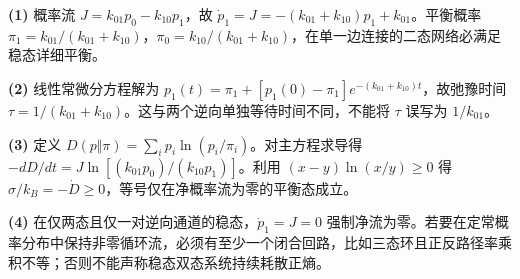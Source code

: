 \par\noindent\textbf{(1)} 概率流 \(J=k_{01}p_0-k_{10}p_1\)，故 \(\dot p_1=J=- (k_{01}+k_{10})p_1+k_{01}\)。平衡概率 \(\pi_1=k_{01}/(k_{01}+k_{10})\)，\(\pi_0=k_{10}/(k_{01}+k_{10})\)，在单一边连接的二态网络必满足稳态详细平衡。
\par\noindent\textbf{(2)} 线性常微分方程解为 \(p_1(t)=\pi_1+[p_1(0)-\pi_1]e^{-(k_{01}+k_{10})t}\)，故弛豫时间 \(\tau=1/(k_{01}+k_{10})\)。这与两个逆向单独等待时间不同，不能将 \(\tau\) 误写为 \(1/k_{01}\)。
\par\noindent\textbf{(3)} 定义 \(D(p\Vert\pi)=\sum_ip_i\ln(p_i/\pi_i)\)。对主方程求导得 \(-dD/dt=J\ln[(k_{01}p_0)/(k_{10}p_1)]\)。利用 \((x-y)\ln(x/y)\ge0\) 得 \(\sigma/k_B=-\dot D\ge0\)，等号仅在净概率流为零的平衡态成立。
\par\noindent\textbf{(4)} 在仅两态且仅一对逆向通道的稳态，\(\dot p_1=J=0\) 强制净流为零。若要在定常概率分布中保持非零循环流，必须有至少一个闭合回路，比如三态环且正反路径率乘积不等；否则不能声称稳态双态系统持续耗散正熵。
